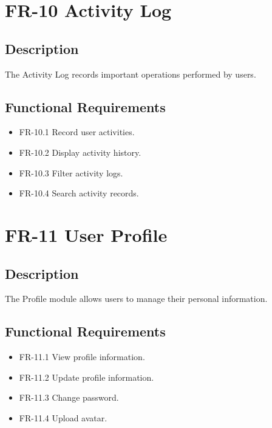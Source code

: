 \section{FR-10 Activity Log}

\subsection*{Description}

The Activity Log records important operations performed by users.

\subsection*{Functional Requirements}

\begin{itemize}
    \item FR-10.1 Record user activities.
    \item FR-10.2 Display activity history.
    \item FR-10.3 Filter activity logs.
    \item FR-10.4 Search activity records.
\end{itemize}

\section{FR-11 User Profile}

\subsection*{Description}

The Profile module allows users to manage their personal information.

\subsection*{Functional Requirements}

\begin{itemize}
    \item FR-11.1 View profile information.
    \item FR-11.2 Update profile information.
    \item FR-11.3 Change password.
    \item FR-11.4 Upload avatar.
\end{itemize}

